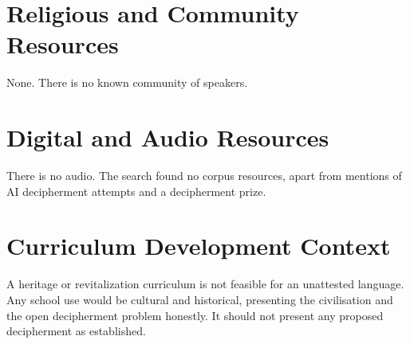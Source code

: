 \documentclass[12pt]{article}
\begin{document}
\section{Religious and Community Resources}
None. There is no known community of speakers.

\section{Digital and Audio Resources}
There is no audio. The search found no corpus resources, apart from mentions of AI decipherment attempts and a decipherment prize.

\section{Curriculum Development Context}
A heritage or revitalization curriculum is not feasible for an unattested language. Any school use would be cultural and historical, presenting the civilisation and the open decipherment problem honestly. It should not present any proposed decipherment as established.
\end{document}
